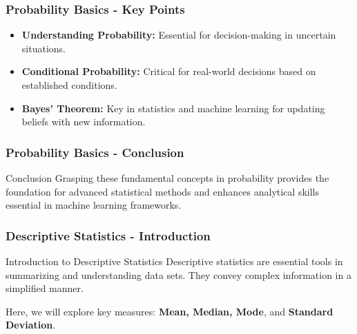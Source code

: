 \documentclass{beamer}
\begin{document}
\begin{frame}[fragile]
    \frametitle{Probability Basics - Key Points}
    \begin{itemize}
        \item \textbf{Understanding Probability:} Essential for decision-making in uncertain situations.
        \item \textbf{Conditional Probability:} Critical for real-world decisions based on established conditions.
        \item \textbf{Bayes' Theorem:} Key in statistics and machine learning for updating beliefs with new information.
    \end{itemize}
\end{frame}

\begin{frame}[fragile]
    \frametitle{Probability Basics - Conclusion}
    \begin{block}{Conclusion}
        Grasping these fundamental concepts in probability provides the foundation for advanced statistical methods and enhances analytical skills essential in machine learning frameworks.
    \end{block}
\end{frame}

\begin{frame}[fragile]
    \frametitle{Descriptive Statistics - Introduction}
    \begin{block}{Introduction to Descriptive Statistics}
        Descriptive statistics are essential tools in summarizing and understanding data sets. They convey complex information in a simplified manner.
    \end{block}
    
    Here, we will explore key measures: \textbf{Mean, Median, Mode}, and \textbf{Standard Deviation}.
\end{frame}
\end{document}
